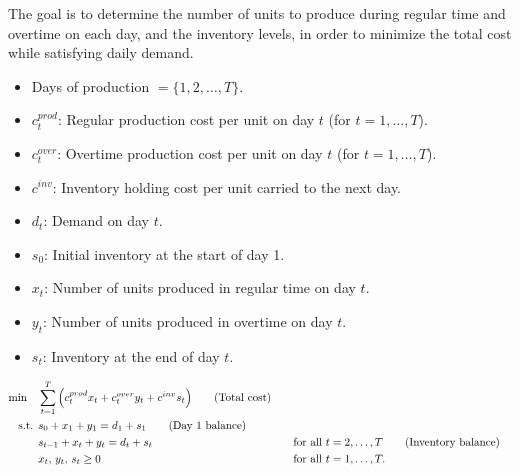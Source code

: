 The goal is to determine the number of units to produce during regular time and overtime on each day, and the inventory levels, in order to minimize the total cost while satisfying daily demand.

\bigskip

\begin{itemize}
    \item Days of production \( = \{1, 2, \dots, T\}\).
\end{itemize}

\begin{itemize}
    \item \(c^{prod}_t\): Regular production cost per unit on day \(t\) (for \(t=1,\dots,T\)).
    \item \(c^{over}_{t}\): Overtime production cost per unit on day \(t\) (for \(t=1,\dots,T\)).
    \item \(c^{inv}\): Inventory holding cost per unit carried to the next day.
    \item \(d_t\): Demand on day \(t\).
    \item \(s_0\): Initial inventory at the start of day 1.
\end{itemize}

\begin{itemize}
    \item \(x_t\): Number of units produced in regular time on day \(t\).
    \item \(y_t\): Number of units produced in overtime on day \(t\).
    \item \(s_t\): Inventory at the end of day \(t\).
\end{itemize}

\begin{align*}
\min \quad & \sum_{t=1}^{T} \Big( c^{prod}_t x_t + c^{over}_{t} y_t + c^{inv} s_t \Big)   \tag{Total cost} \\
\text{ s.t. }        & s_0 + x_1 + y_1 = d_1 + s_1   \tag{Day 1 balance} \\
             & s_{t-1} + x_t + y_t = d_t + s_t &&\quad \text{for all } t = 2,\dots,T   \tag{Inventory balance} \\
             & x_t,\, y_t,\, s_t \ge 0 &&\quad \text{for all } t = 1,\dots,T.
\end{align*}

\newpage

